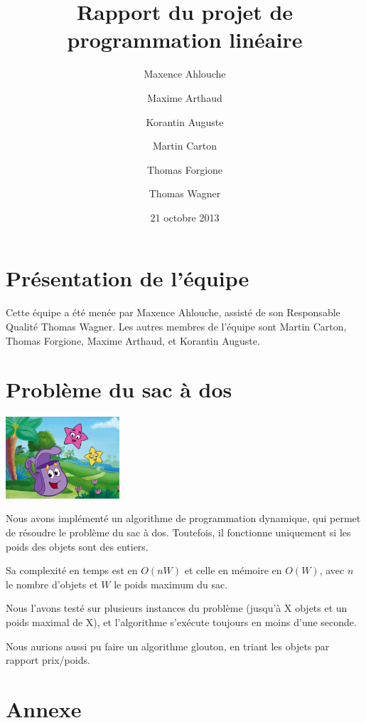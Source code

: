 \documentclass{scrartcl}
\begin{document}
\title{Rapport du projet de programmation linéaire}
\author{Maxence Ahlouche \and Maxime Arthaud \and Korantin Auguste
          \and Martin Carton \and Thomas Forgione \and Thomas Wagner}
\date{21 octobre 2013}
\maketitle
\tableofcontents
\newpage

\section{Présentation de l'équipe}
  Cette équipe a été menée par Maxence Ahlouche, assisté de son Responsable
  Qualité Thomas Wagner. Les autres membres de l'équipe sont Martin Carton,
  Thomas Forgione, Maxime Arthaud, et Korantin Auguste.

  
\section{Problème du sac à dos}
  \begin{center}\includegraphics[width=120pt]{sac_a_dos.jpg}\end{center}

  Nous avons implémenté un algorithme de programmation dynamique, qui permet de
  résoudre le problème du sac à dos.  Toutefois, il fonctionne uniquement si
  les poids des objets sont des entiers.

  Sa complexité en temps est en $O(nW)$ et celle en mémoire en $O(W)$, avec $n$
  le nombre d'objets et $W$ le poids maximum du sac.

  Nous l'avons testé sur plusieurs instances du problème (jusqu'à X objets et
  un poids maximal de X), et l'algorithme s'exécute toujours en moins d'une
  seconde. %

  Nous aurions aussi pu faire un algorithme glouton, en triant les objets par
  rapport prix/poids.

\section{Annexe}
  \lstlistoflistings
  
\end{document}

